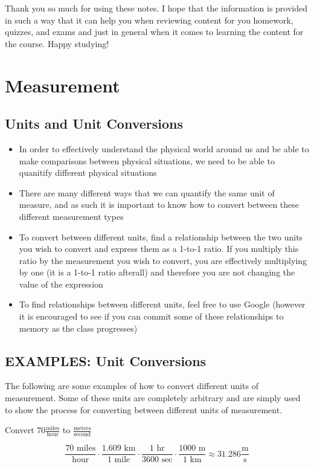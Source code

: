 \documentclass{package/notes}
\begin{document}
Thank you so much for using these notes. I hope that the information is provided in such a way that it can help you when reviewing content for you homework, quizzes, and exams and just in general when it comes to learning the content for the course. Happy studying!

\newpage


\chapter{Measurement}

\section{Units and Unit Conversions}

\begin{itemize}
	\item In order to effectively understand the physical world around us and be able to make comparisons between physical situations, we need to be able to quanitify different physical situations
	\item There are many different ways that we can quantify the same unit of measure, and as such it is important to know how to convert between these different measurement types 
	\item To convert between different units, find a relationship between the two units you wish to convert and express them as a 1-to-1 ratio. If you multiply this ratio by the measurement you wish to convert, you are effectively multiplying by one (it is a 1-to-1 ratio afterall) and therefore you are not changing the value of the expression
	\item To find relationships between different units, feel free to use Google (however it is encouraged to see if you can commit some of these relationships to memory as the class progresses)
\end{itemize}

\section{EXAMPLES: Unit Conversions}

The following are some examples of how to convert different units of measurement. Some of these units are completely arbitrary and are simply used to show the process for converting between different units of measurement.

\begin{problem}	
	Convert $70 \frac{\text{miles}}{\text{hour}}$ to $\frac{\text{meters}}{\text{second}}$
 
	$$
	\frac{70\text{ miles}}{\text{hour}}\cdot\frac{1.609 \text{ km}}{1 \text{ mile}}\cdot\frac{1 \text{ hr}}{3600 \text{ sec}}\cdot\frac{1000 \text{ m}}{1 \text{ km}} \approx 31.286 \frac{\text{m}}{\text{s}}
	$$
\end{problem}\newpage
\end{document}
